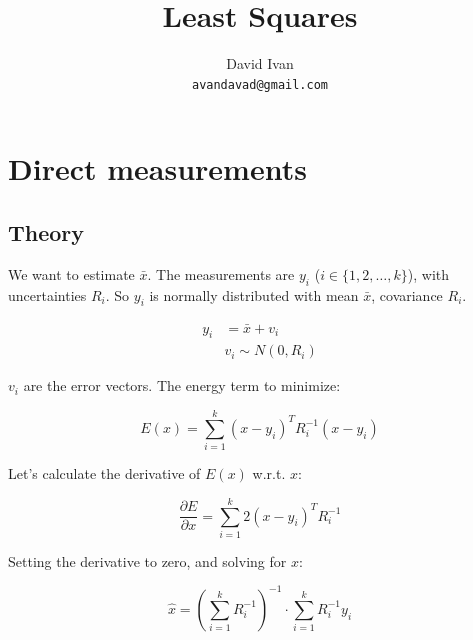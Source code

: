\documentclass{article}
\begin{document}
\title{Least Squares}

\author{David Ivan \\
{\tt\small avandavad@gmail.com}
}

\maketitle


\section{Direct measurements}

\subsection{Theory}

We want to estimate $\bar{x}$. The measurements are $y_i$ ($i \in \{1,2,\dots,k\}$), with uncertainties $R_i$. So $y_i$ is normally distributed with mean $\bar{x}$, covariance $R_i$.

\begin{equation}
\begin{split}
    y_i &= \bar{x} + v_i \\
    &v_i \sim N(0, R_i)
\end{split}
\end{equation}

$v_i$ are the error vectors. The energy term to minimize:

\begin{equation}
    E(x) = \sum_{i=1}^{k} (x - y_i)^T R^{-1}_i (x - y_i)
\end{equation}

Let's calculate the derivative of $E(x)$ w.r.t. $x$:

\begin{equation}
    \frac{\partial E}{\partial x} = \sum_{i=1}^{k} 2 (x - y_i)^T R^{-1}_i
\end{equation}

Setting the derivative to zero, and solving for $x$:

\begin{equation}
    \boxed{\hat{x} = \left( \sum_{i=1}^{k} R^{-1}_i \right)^{-1} \cdot \sum_{i=1}^{k} R^{-1}_i y_i}
\end{equation}
\end{document}
